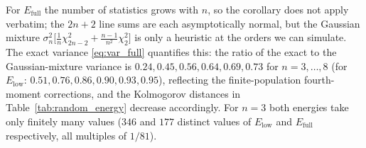\begin{remark}
For $E_{\mathrm{full}}$ the number of statistics grows with $n$, so the corollary does not apply
verbatim; the $2n+2$ line sums are each asymptotically normal, but the Gaussian mixture
$\sigma_n^2\big[\tfrac1n\chi^2_{2n-2}+\tfrac{n-1}{n^2}\chi^2_2\big]$ is only a heuristic at the
orders we can simulate. The exact variance \eqref{eq:var_full} quantifies this: the ratio of the
exact to the Gaussian-mixture variance is $0.24, 0.45, 0.56, 0.64, 0.69, 0.73$ for $n=3,\dots,8$
(for $E_{\mathrm{low}}$: $0.51, 0.76, 0.86, 0.90, 0.93, 0.95$), reflecting the finite-population
fourth-moment corrections, and the Kolmogorov distances in Table~\ref{tab:random_energy} decrease
accordingly. For $n=3$ both energies take only finitely many values ($346$ and $177$ distinct values
of $E_{\mathrm{low}}$ and $E_{\mathrm{full}}$ respectively, all multiples of $1/81$).
\end{remark}

